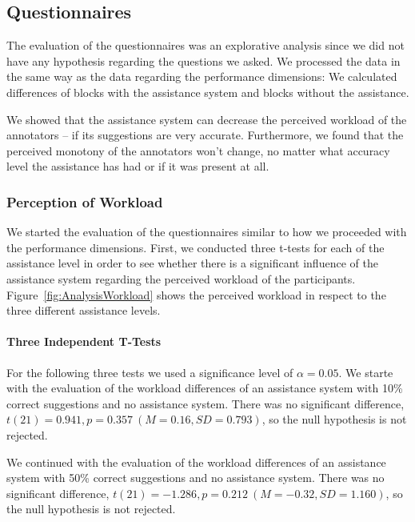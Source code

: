 \subsection{Questionnaires}
	The evaluation of the questionnaires was an explorative analysis since we did not have any hypothesis regarding the questions we asked. We processed the data in the same way as the data regarding the performance dimensions: We calculated differences of blocks with the assistance system and blocks without the assistance.

	We showed that the assistance system can decrease the perceived workload of the annotators -- if its suggestions are very accurate. Furthermore, we found that the perceived monotony of the annotators won't change, no matter what accuracy level the assistance has had or if it was present at all.

	\subsubsection{Perception of Workload}
		We started the evaluation of the questionnaires similar to how we proceeded with the performance dimensions. First, we conducted three t-tests for each of the assistance level in order to see whether there is a significant influence of the assistance system regarding the perceived workload of the participants. Figure~\ref{fig:AnalysisWorkload} shows the perceived workload in respect to the three different assistance levels.


		\paragraph{Three Independent T-Tests}
		For the following three tests we used a significance level of \(\alpha = 0.05\). We starte with the evaluation of the workload differences of an assistance system with 10\% correct suggestions and no assistance system. There was no significant difference, \(t(21) = 0.941, p = 0.357\ (M = 0.16, SD = 0.793)\), so the null hypothesis is not rejected.

		We continued with the evaluation of the workload differences of an assistance system with 50\% correct suggestions and no assistance system. There was no significant difference, \(t(21) = -1.286, p = 0.212\ (M = -0.32, SD = 1.160)\), so the null hypothesis is not rejected.

